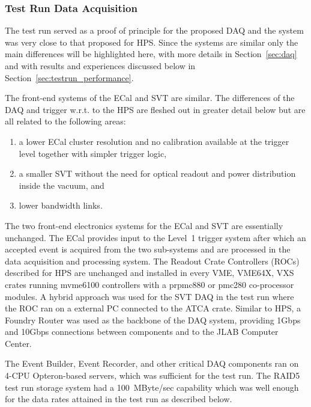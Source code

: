 
\subsubsection{Test Run Data Acquisition}
\label{sec:testrun_daq}
The test run served as a proof of principle for the proposed DAQ and the system was very 
close to that proposed for HPS. Since the systems are similar only the main differences will be highlighted here,  with more details in Section~\ref{sec:daq} and with results and experiences discussed below in Section~\ref{sec:testrun_performance}. 



The front-end systems of the ECal and SVT are similar. 
The differences of the DAQ and trigger w.r.t. to the HPS are fleshed out in greater detail below but 
are all related to the following areas:
\begin{enumerate}
\item a lower ECal cluster resolution and no calibration available at the trigger level together with simpler trigger logic, 
\item a smaller SVT without the need for optical readout and power distribution inside the vacuum,
and
\item lower bandwidth links.
\end{enumerate}

The two front-end electronics systems for the ECal and SVT are essentially unchanged. The ECal provides 
input to the Level~1 trigger system after which an accepted event is acquired from the two sub-systems 
and are processed in the data acquisition and processing system. The Readout Crate Controllers (ROCs)
 described for HPS are unchanged and installed in every VME, VME64X, VXS crates running 
 mvme6100 controllers with a prpmc880 or pmc280 co-processor modules. A hybrid approach was 
 used for the SVT DAQ in the test run where the ROC ran on a external PC connected to the ATCA crate. 
 Similar to HPS, a Foundry Router was used as the backbone of the DAQ system, providing 1Gbps and 
 10Gbps connections between components and to the JLAB Computer Center.

The Event Builder, Event Recorder, and other critical DAQ components ran on 
4-CPU Opteron-based servers, which was sufficient for the test run. The RAID5 test run storage system 
had a 100~MByte/sec capability which was well enough for the data rates attained in the test run as 
described below. 






